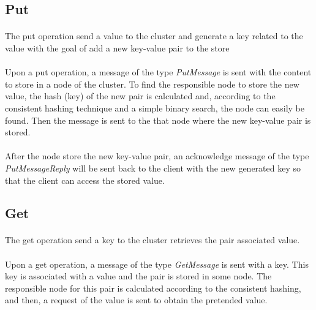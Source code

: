\documentclass{report}
\begin{document}
				\subsection{Put}
					\paragraph{} The put operation send a value to the cluster and generate a key
					related to the value with the goal of add a new key-value pair to the store

					\paragraph{} Upon a put operation, a message of the type \emph{PutMessage}
					is sent with the content to store in a node of the cluster. To find the
					responsible node to store the new value, the hash (key) of the new pair is 
					calculated and, according to the consistent hashing technique and a 
					simple binary search, the node can easily be found. Then the message is
					sent to the that node where the new key-value pair is stored.

					\paragraph{} After the node store the new key-value pair, an acknowledge
					message of the type \emph{PutMessageReply} will be sent back to the client
					with the new generated key so that the client can access the stored value.

				\subsection{Get}
					\paragraph{} The get operation send a key to the cluster retrieves
					the pair associated value.

					\paragraph{} Upon a get operation, a message of the type \emph{GetMessage}
					is sent with a key. This key is associated with a value and the pair is
					stored in some node. The responsible node for this pair is calculated
					according to the consistent hashing, and then, a request of the value
					is sent to obtain the pretended value.
\end{document}
